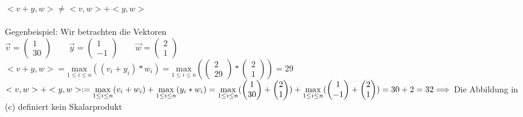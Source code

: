 \documentclass[a4paper,10pt]{article}
\begin{document}
\begin{compactenum} [(a)]
		\item $ <v+y,w> \neq <v,w> + <y,w> $\\\\
		Gegenbeispiel: Wir betrachten die Vektoren\\
		$ \vec{v} = \begin{pmatrix}
		1 \\ 30
		\end{pmatrix} \qquad
		\vec{y} = \begin{pmatrix}
		1 \\ -1
		\end{pmatrix} \qquad
		\vec{w} = \begin{pmatrix}
		2 \\ 1
		\end{pmatrix}$\\
		$ <v+y,w> = \underset{1 \leq i \leq n}{\text{max}} (
			(v_i+y_i) * w_i) = \underset{1 \leq i \leq n}{\text{max}} (\begin{pmatrix} 2 \\ 29 \end{pmatrix} * 
			\begin{pmatrix} 2 \\ 1 \end{pmatrix}) = 29 $ \\
		$ <v,w> + <y,w> := \underset{1 \leq i \leq n}{\text{max}} (v_i + w_i) + \underset{1 \leq i \leq n}{\text{max}} (y_i * w_i) = 
		\underset{1 \leq i \leq n}{\text{max}} (
		\begin{pmatrix}
		1 \\ 30
		\end{pmatrix} + 
		\begin{pmatrix}
		2 \\ 1
		\end{pmatrix}) + \underset{1 \leq i \leq n}{\text{max}} (
		\begin{pmatrix}
		1 \\ -1
		\end{pmatrix} + 
		\begin{pmatrix}
		2 \\ 1
		\end{pmatrix} )\\
		= 30 + 2 = 32 \\
		\Longrightarrow $ Die Abbildung in (c) definiert kein Skalarprodukt
		
	\end{compactenum} \
	
\end{document}
